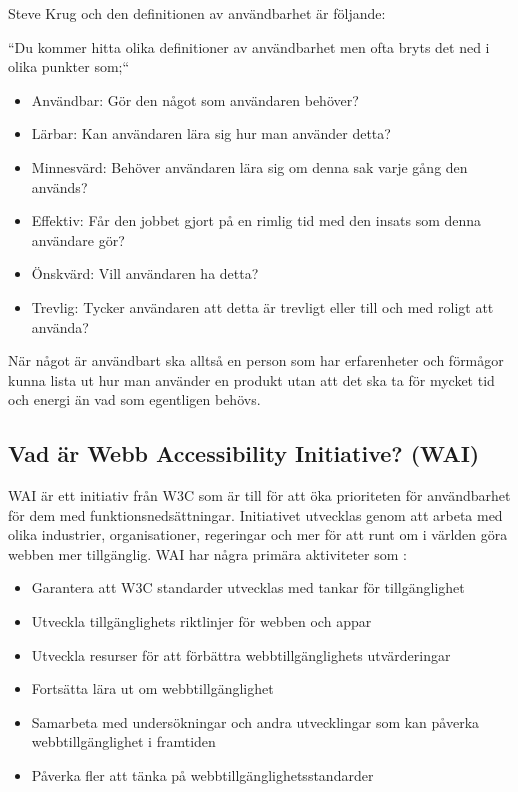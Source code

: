 \documentclass[11p]{article}
\begin{document}
    Steve Krug och den definitionen av användbarhet är följande:

    ``Du kommer hitta olika definitioner av användbarhet men ofta bryts det ned i olika punkter som;``

    \begin{itemize}
        \item Användbar: Gör den något som användaren behöver?
        \item Lärbar: Kan användaren lära sig hur man använder detta?
        \item Minnesvärd: Behöver användaren lära sig om denna sak varje gång den används?
        \item Effektiv: Får den jobbet gjort på en rimlig tid med den insats som denna användare gör?
        \item Önskvärd: Vill användaren ha detta?
        \item Trevlig: Tycker användaren att detta är trevligt eller till och med roligt att använda?
    \end{itemize}

    När något är användbart ska alltså en person som har erfarenheter och förmågor kunna lista ut hur man använder en produkt utan att det ska ta för mycket tid och energi än vad som egentligen behövs.

    \subsection{Vad är Webb Accessibility Initiative? (WAI)}
    WAI är ett initiativ från W3C som är till för att öka prioriteten för användbarhet för dem med funktionsnedsättningar.
    Initiativet utvecklas genom att arbeta med olika industrier, organisationer, regeringar och mer för att runt om i världen göra webben mer tillgänglig.
    WAI har några primära aktiviteter som \textcite{WAI}:

    \begin{itemize}
        \item Garantera att W3C standarder utvecklas med tankar för tillgänglighet
        \item Utveckla tillgänglighets riktlinjer för webben och appar
        \item Utveckla resurser för att förbättra webbtillgänglighets utvärderingar
        \item Fortsätta lära ut om webbtillgänglighet
        \item Samarbeta med undersökningar och andra utvecklingar som kan påverka webbtillgänglighet i framtiden
        \item Påverka fler att tänka på webbtillgänglighetsstandarder
    \end{itemize}
\end{document}

